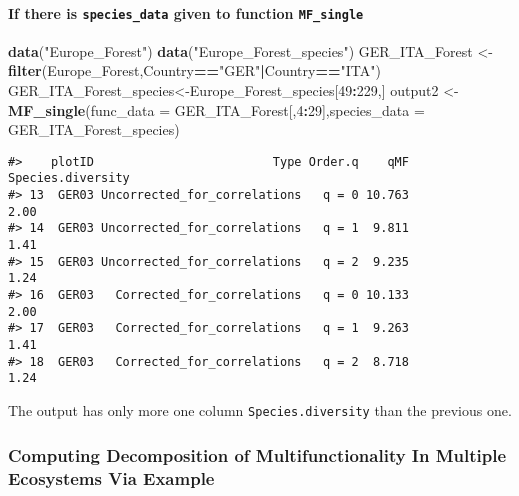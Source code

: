 \documentclass[
]{article}
\newenvironment{Shaded}{\begin{snugshade}}{\end{snugshade}}
\newcommand{\AttributeTok}[1]{\textcolor[rgb]{0.13,0.29,0.53}{#1}}
\newcommand{\DecValTok}[1]{\textcolor[rgb]{0.00,0.00,0.81}{#1}}
\newcommand{\FunctionTok}[1]{\textcolor[rgb]{0.13,0.29,0.53}{\textbf{#1}}}
\newcommand{\NormalTok}[1]{#1}
\newcommand{\OtherTok}[1]{\textcolor[rgb]{0.56,0.35,0.01}{#1}}
\newcommand{\SpecialCharTok}[1]{\textcolor[rgb]{0.81,0.36,0.00}{\textbf{#1}}}
\newcommand{\StringTok}[1]{\textcolor[rgb]{0.31,0.60,0.02}{#1}}
\begin{document}
\hypertarget{if-there-is-species_data-given-to-function-mf_single}{%
\paragraph{\texorpdfstring{If there is \texttt{species\_data} given to
function
\texttt{MF\_single}}{If there is species\_data given to function MF\_single}}\label{if-there-is-species_data-given-to-function-mf_single}}

\begin{Shaded}
\begin{Highlighting}[]
\FunctionTok{data}\NormalTok{(}\StringTok{"Europe\_Forest"}\NormalTok{)}
\FunctionTok{data}\NormalTok{(}\StringTok{"Europe\_Forest\_species"}\NormalTok{)}
\NormalTok{GER\_ITA\_Forest }\OtherTok{\textless{}{-}} \FunctionTok{filter}\NormalTok{(Europe\_Forest,Country}\SpecialCharTok{==}\StringTok{"GER"}\SpecialCharTok{|}\NormalTok{Country}\SpecialCharTok{==}\StringTok{"ITA"}\NormalTok{)}
\NormalTok{GER\_ITA\_Forest\_species}\OtherTok{\textless{}{-}}\NormalTok{Europe\_Forest\_species[}\DecValTok{49}\SpecialCharTok{:}\DecValTok{229}\NormalTok{,]}
\NormalTok{output2 }\OtherTok{\textless{}{-}} \FunctionTok{MF\_single}\NormalTok{(}\AttributeTok{func\_data =}\NormalTok{ GER\_ITA\_Forest[,}\DecValTok{4}\SpecialCharTok{:}\DecValTok{29}\NormalTok{],}\AttributeTok{species\_data =}\NormalTok{ GER\_ITA\_Forest\_species)}
\end{Highlighting}
\end{Shaded}

\begin{verbatim}
#>    plotID                         Type Order.q    qMF Species.diversity
#> 13  GER03 Uncorrected_for_correlations   q = 0 10.763              2.00
#> 14  GER03 Uncorrected_for_correlations   q = 1  9.811              1.41
#> 15  GER03 Uncorrected_for_correlations   q = 2  9.235              1.24
#> 16  GER03   Corrected_for_correlations   q = 0 10.133              2.00
#> 17  GER03   Corrected_for_correlations   q = 1  9.263              1.41
#> 18  GER03   Corrected_for_correlations   q = 2  8.718              1.24
\end{verbatim}

The output has only more one column \texttt{Species.diversity} than the
previous one.

\hypertarget{computing-decomposition-of-multifunctionality-in-multiple-ecosystems-via-example}{%
\subsubsection{Computing Decomposition of Multifunctionality In Multiple
Ecosystems Via
Example}\label{computing-decomposition-of-multifunctionality-in-multiple-ecosystems-via-example}}
\end{document}
